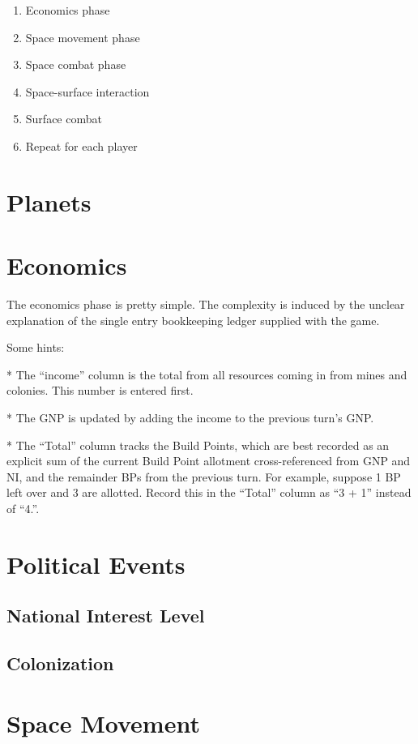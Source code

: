 \documentclass[10pt]{article}
\begin{document}
\begin{multicols}{2}
\begin{enumerate}
  \item Economics phase
  \item Space movement phase
  \item Space combat phase
  \item Space-surface interaction
  \item Surface combat
  \item Repeat for each player
\end{enumerate}

\section{Planets}
\section{Economics}


The economics phase is pretty simple. The complexity is induced
by the unclear explanation of the single entry bookkeeping ledger
supplied with the game.

Some hints:

* The ``income'' column is the total from all resources coming in from mines
and colonies. This number is entered first.

* The GNP is updated by adding the income to the previous turn's GNP.

* The ``Total'' column tracks the Build Points, which are best recorded
as an explicit sum of the current Build Point allotment cross-referenced
from GNP and NI, and the remainder BPs from the previous turn. For example,
suppose 1 BP left over and 3 are allotted. Record this in the ``Total'' column
as ``3 + 1'' instead of ``4.''.

\section{Political Events}
\subsection{National Interest Level}
\subsection{Colonization}

\section{Space Movement}


\end{multicols}
\end{document}
